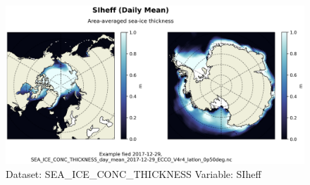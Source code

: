 \begin{figure}[H]
\centering
\includegraphics[scale=0.55]{../images/plots/latlon_plots/Sea-Ice_and_Snow_Concentration_and_Thickness/SIheff.png}
\caption{Dataset: SEA\_ICE\_CONC\_THICKNESS Variable: SIheff}
\label{tab:table-SEA_ICE_CONC_THICKNESS_SIheff-Plot}
\end{figure}
\pagebreak
